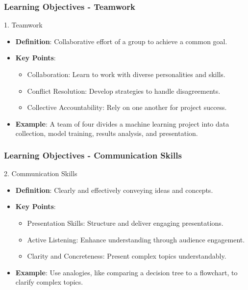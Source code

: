 \documentclass{beamer}
\begin{document}
\begin{frame}[fragile]
    \frametitle{Learning Objectives - Teamwork}
    \begin{block}{1. Teamwork}
        \begin{itemize}
            \item \textbf{Definition}: Collaborative effort of a group to achieve a common goal.
            \item \textbf{Key Points}:
            \begin{itemize}
                \item Collaboration: Learn to work with diverse personalities and skills.
                \item Conflict Resolution: Develop strategies to handle disagreements.
                \item Collective Accountability: Rely on one another for project success.
            \end{itemize}
            \item \textbf{Example}: A team of four divides a machine learning project into data collection, model training, results analysis, and presentation.
        \end{itemize}
    \end{block}
\end{frame}

\begin{frame}[fragile]
    \frametitle{Learning Objectives - Communication Skills}
    \begin{block}{2. Communication Skills}
        \begin{itemize}
            \item \textbf{Definition}: Clearly and effectively conveying ideas and concepts.
            \item \textbf{Key Points}:
            \begin{itemize}
                \item Presentation Skills: Structure and deliver engaging presentations.
                \item Active Listening: Enhance understanding through audience engagement.
                \item Clarity and Concreteness: Present complex topics understandably.
            \end{itemize}
            \item \textbf{Example}: Use analogies, like comparing a decision tree to a flowchart, to clarify complex topics.
        \end{itemize}
    \end{block}
\end{frame}
\end{document}
